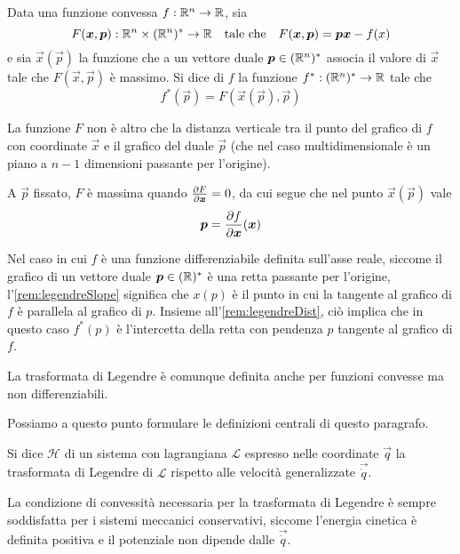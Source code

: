 \begin{definition}
  Data una funzione convessa $f:\mathbb{R}^{n}\to \mathbb{R}$, sia \begin{equation}
  F(\vec{x},\vec{p}): \R^{n} \times (\R^{n})^* \to \R \qqtext{tale che} F(\vec{x},\vec{p}) = \vec{p}\vec{x} - f(x)
  \end{equation} 
  e sia $\vec{x}(\vec{p})$ la funzione che a un vettore duale $\boldsymbol{p} \in (\mathbb{R}^{n})^*$ associa il valore di $\vec{x}$ tale che $F(\vec{x},\vec{p})$ è massimo. Si dice  di $f$ la funzione $f^*:(\mathbb{R}^{n})^* \to \mathbb{R}$ tale che \begin{equation}
  f^*(\vec{p}) = F(\vec{x}(\vec{p}), \vec{p})
  \end{equation} 
\end{definition}
\begin{remark} \label{rem:legendreDist}
  La funzione $F$ non è altro che la distanza verticale tra il punto del grafico di $f$ con coordinate $\vec{x}$ e il grafico del duale $\vec{p}$ (che nel caso multidimensionale è un piano a $n-1$ dimensioni passante per l'origine). 
\end{remark}
\begin{remark} \label{rem:legendreSlope}
  A $\vec{p}$ fissato, $F$ è massima quando $\pdv{F}{\boldsymbol{x}}=0$, da cui segue che nel punto $\vec{x}(\vec{p})$ vale \begin{equation}
    \boldsymbol{p}=\pdv{f}{\boldsymbol{x}}()(\boldsymbol{x})
  \end{equation}
\end{remark}
\begin{remark}
  Nel caso in cui $f$ è una funzione differenziabile definita sull'asse reale, siccome il grafico di un vettore duale $\boldsymbol{p} \in  (\mathbb{R})^*$ è una retta passante per l'origine, l'\autoref{rem:legendreSlope} significa che $x(p)$ è il punto in cui la tangente al grafico di $f$ è parallela al grafico di $p$. Insieme all'\autoref{rem:legendreDist}, ciò implica che in questo caso $f^*(p)$ è l'intercetta della retta con pendenza $p$ tangente al grafico di $f$.
\end{remark}
\begin{remark}
  La trasformata di Legendre è comunque definita anche per funzioni convesse ma non differenziabili.
\end{remark}

Possiamo a questo punto formulare le definizioni centrali di questo paragrafo.
\begin{definition}
  Si dice  $\mathcal{H}$ di un sistema con lagrangiana $\mathcal{L}$ espresso nelle coordinate $\vec{q}$ la trasformata di Legendre di $\mathcal{L}$ rispetto alle velocità generalizzate $\vec{\dot{q}}$. 
\end{definition}
\begin{remark}
  La condizione di convessità necessaria per la trasformata di Legendre è sempre soddisfatta per i sistemi meccanici conservativi, siccome l'energia cinetica è definita positiva e il potenziale non dipende dalle $\vec{\dot{q}}$.
\end{remark}

